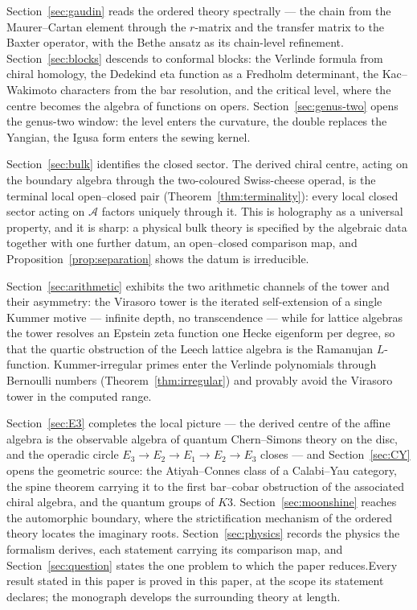 \documentclass[11pt]{amsart}
\numberwithin{equation}{section}
\theoremstyle{plain}
\theoremstyle{definition}
\theoremstyle{remark}
\newcommand{\cA}{\mathcal{A}}
\begin{document}
Section~\ref{sec:gaudin} reads the ordered theory spectrally --- the
chain from the Maurer--Cartan element through the $r$-matrix and the
transfer matrix to the Baxter operator, with the Bethe ansatz as its
chain-level refinement. Section~\ref{sec:blocks} descends to
conformal blocks: the Verlinde formula from chiral homology, the
Dedekind eta function as a Fredholm determinant, the Kac--Wakimoto
characters from the bar resolution, and the critical level, where the
centre becomes the algebra of functions on opers.
Section~\ref{sec:genus-two} opens the genus-two window: the level
enters the curvature, the double replaces the Yangian, the Igusa form
enters the sewing kernel.

Section~\ref{sec:bulk} identifies the closed sector. The derived chiral
centre, acting on the boundary algebra through the two-coloured Swiss-cheese
operad, is the terminal local open--closed pair
(Theorem~\ref{thm:terminality}): every local closed sector acting on $\cA$
factors uniquely through it. This is holography as a universal property, and
it is sharp: a physical bulk theory is specified by the algebraic data
together with one further datum, an open--closed comparison map, and
Proposition~\ref{prop:separation} shows the datum is irreducible.

Section~\ref{sec:arithmetic} exhibits the two arithmetic channels of the
tower and their asymmetry: the Virasoro tower is the iterated self-extension
of a single Kummer motive --- infinite depth, no transcendence --- while for
lattice algebras the tower resolves an Epstein zeta function one Hecke
eigenform per degree, so that the quartic obstruction of the Leech lattice
algebra is the Ramanujan $L$-function. Kummer-irregular primes enter the
Verlinde polynomials through Bernoulli numbers (Theorem~\ref{thm:irregular})
and provably avoid the Virasoro tower in the computed range.

Section~\ref{sec:E3} completes the local picture --- the derived
centre of the affine algebra is the observable algebra of quantum
Chern--Simons theory on the disc, and the operadic circle
$E_3\to E_2\to E_1\to E_2\to E_3$ closes --- and
Section~\ref{sec:CY} opens the geometric source: the Atiyah--Connes
class of a Calabi--Yau category, the spine theorem carrying it to the
first bar--cobar obstruction of the associated chiral algebra, and
the quantum groups of $K3$. Section~\ref{sec:moonshine} reaches the
automorphic boundary, where the strictification mechanism of the
ordered theory locates the imaginary roots.
Section~\ref{sec:physics} records the physics the formalism derives,
each statement carrying its comparison map, and
Section~\ref{sec:question} states the one problem to which the paper
reduces.Every result stated in this paper is proved in this paper, at the
scope its statement declares; the monograph \cite{Vol1} develops the
surrounding theory at length.
\end{document}
